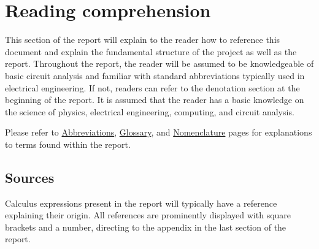 \chapter*{Reading comprehension} \label{cha:report_structure}
This section of the report will explain to the reader how to reference this document and explain the fundamental structure of the project as well as the report. Throughout the report, the reader will be assumed to be knowledgeable of basic circuit analysis and familiar with standard abbreviations typically used in electrical engineering. If not, readers can refer to the denotation section at the beginning of the report. It is assumed that the reader has a basic knowledge on the science of physics, electrical engineering, computing, and circuit analysis.

Please refer to \hyperref[cha:abbr]{Abbreviations}, \hyperref[cha:glos]{Glossary}, and \hyperref[cha:nomenclature]{Nomenclature} pages for explanations to terms found within the report.


\section*{Sources}
Calculus expressions present in the report will typically have a reference explaining their origin. All references are prominently displayed with square brackets and a number, directing to the appendix in the last section of the report.

